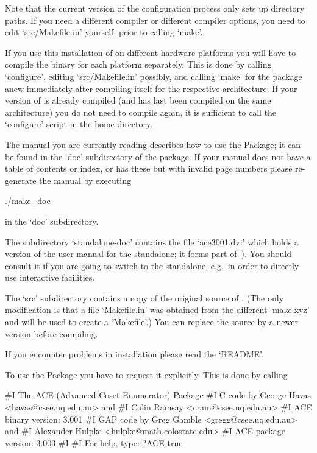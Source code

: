 Note that the  current version of the configuration  process only sets
up  directory paths.  If you  need a  different compiler  or different
compiler options, you need to edit `src/Makefile.in'  yourself,  prior
to calling `make'.

If you use this installation of {\GAP} on different hardware platforms
you will have to compile the binary for each platform separately. This
is done by calling `configure',  editing  `src/Makefile.in'  possibly,
and calling `make' for the package anew  immediately  after  compiling
{\GAP} itself for the respective  architecture.  If  your  version  of
{\GAP} is already compiled (and has last been  compiled  on  the  same
architecture)  you  do  not  need  to  compile  {\GAP}  again,  it  is
sufficient  to  call  the  `configure'  script  in  the  {\GAP}   home
directory.

The manual you are currently reading describes how to use  the  {\ACE}
Package; it can be found in the `doc' subdirectory of the package.  If
your manual does not have a table of contents or index, or  has  these
but with  invalid  page  numbers  please  re-generate  the  manual  by
executing

\begintt
./make_doc
\endtt

in the `doc' subdirectory.

The  subdirectory  `standalone-doc'  contains the  file  `ace3001.dvi'
which holds a version of the user manual for the {\ACE} standalone; it
forms part of~\cite{Ram99}).  You  should consult it if  you are going
to  switch to  the {\ACE}  standalone, e.g.~in  order to  directly use
interactive facilities.

The  `src' subdirectory  contains a  copy  of the  original source  of
{\ACE}.  (The  only modification  is  that  a  file `Makefile.in'  was
obtained from  the different `make.xyz' and  will be used  to create a
`Makefile'.)  You  can replace  the source by  a newer  version before
compiling.

If you encounter problems in installation please read the `README'.


To use the {\ACE} Package you have to request it explicitly.  This  is
done by calling

\beginexample
#I      The ACE (Advanced Coset Enumerator) Package
#I    C code by George Havas <havas@csee.uq.edu.au> and
#I              Colin Ramsay <cram@csee.uq.edu.au>
#I                   ACE binary version: 3.001
#I    GAP code by Greg Gamble <gregg@csee.uq.edu.au> and
#I           Alexander Hulpke <hulpke@math.colostate.edu>
#I                   ACE package version: 3.003
#I  
#I                   For help, type: ?ACE
true
\endexample

